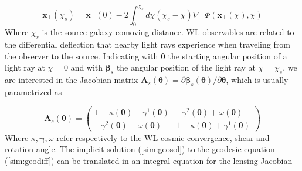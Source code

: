 \documentclass[reprint,aps,prd,superscriptaddress,showkeys,showpacs]{revtex4-1}
\newcommand{\bb}[1]{\mathbf{#1}}
\newcommand\pt{\pmb{\theta}}
\begin{document}
\begin{equation}
\label{sim:geosol}
\bb{x}_\perp(\chi_s) = \bb{x}_\perp(0) -2\int_0^{\chi_s} d\chi (\chi_s-\chi) \nabla_\perp \Phi(\bb{x}_\perp(\chi),\chi)
\end{equation}
%
Where $\chi_s$ is the source galaxy comoving distance. WL observables are related to the differential deflection that nearby light rays experience when traveling from the observer to the source. Indicating with $\pt$ the starting angular position of a light ray at $\chi=0$ and with $\pmb{\beta}_s$ the angular position of the light ray at $\chi=\chi_s$, we are interested in the Jacobian matrix $\bb{A}_s(\pt)=\partial\pmb{\beta}_s(\pt)/\partial \pt$, which is usually parametrized as 

\begin{equation}
\bb{A}_s(\pt) = 
\begin{pmatrix}
1-\kappa(\pt)-\gamma^1(\pt) & -\gamma^2(\pt) + \omega(\pt) \\
-\gamma^2(\pt) - \omega(\pt) & 1-\kappa(\pt)+\gamma^1(\pt)
\end{pmatrix}
\end{equation}
%
Where $\kappa,\pmb{\gamma},\omega$ refer respectively to the WL cosmic convergence, shear and rotation angle. The implicit solution (\ref{sim:geosol}) to the geodesic equation (\ref{sim:geodiff}) can be translated in an integral equation for the lensing Jacobian
\end{document}
